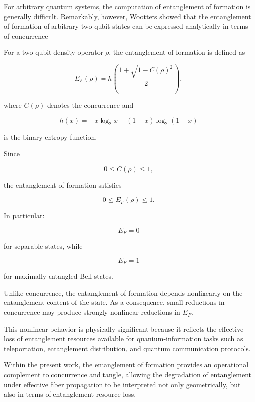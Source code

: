 \medskip

For arbitrary quantum systems, the computation of entanglement of formation is generally difficult. Remarkably, however, Wootters showed that the entanglement of formation of arbitrary two-qubit states can be expressed analytically in terms of concurrence \cite{wootters_entanglement_1998}.

\medskip

For a two-qubit density operator \( \rho \), the entanglement of formation is defined as

\begin{equation}
E_F(\rho)
=
h
\left(
\frac{
1
+
\sqrt{1-C(\rho)^2}
}{2}
\right),
\label{eq:eof_definition}
\end{equation}

where \( C(\rho) \) denotes the concurrence and

\begin{equation}
h(x)
=
-
x \log_2 x
-
(1-x)\log_2(1-x)
\label{eq:binary_entropy_function}
\end{equation}

is the binary entropy function.

\medskip

Since

\[
0
\leq
C(\rho)
\leq
1,
\]

the entanglement of formation satisfies

\[
0
\leq
E_F(\rho)
\leq
1.
\]

In particular:

\[
E_F
=
0
\]

for separable states, while

\[
E_F
=
1
\]

for maximally entangled Bell states.

\medskip

Unlike concurrence, the entanglement of formation depends nonlinearly on the entanglement content of the state. As a consequence, small reductions in concurrence may produce strongly nonlinear reductions in \( E_F \).

\medskip

This nonlinear behavior is physically significant because it reflects the effective loss of entanglement resources available for quantum-information tasks such as teleportation, entanglement distribution, and quantum communication protocols.

\medskip

Within the present work, the entanglement of formation provides an operational complement to concurrence and tangle, allowing the degradation of entanglement under effective fiber propagation to be interpreted not only geometrically, but also in terms of entanglement-resource loss.

